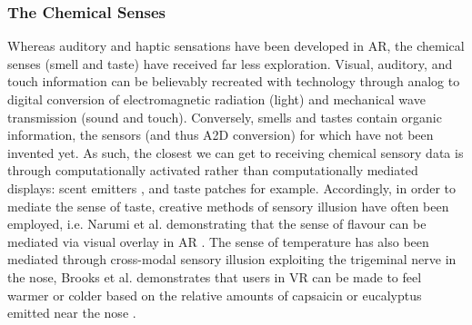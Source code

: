 \subsubsection{The Chemical Senses}\label{sec: literature-interface-sensory-chemical}
Whereas auditory and haptic sensations have been developed in AR, the chemical senses (smell and taste) have received far less exploration. Visual, auditory, and touch information can be believably recreated with technology through analog to digital conversion of electromagnetic radiation (light) and mechanical wave transmission (sound and touch). Conversely, smells and tastes contain organic information, the sensors (and thus A2D conversion) for which have not been invented yet. As such, the closest we can get to receiving chemical sensory data is through computationally activated rather than computationally mediated displays: scent emitters \citep{maggioni2019}, and taste patches for example. Accordingly, in order to mediate the sense of taste, creative methods of sensory illusion have often been employed, i.e. Narumi et al. demonstrating that the sense of flavour can be mediated via visual overlay in AR \citep{narumi2011}. The sense of temperature has also been mediated through cross-modal sensory illusion exploiting the trigeminal nerve in the nose, Brooks et al. demonstrates that users in VR can be made to feel warmer or colder based on the relative amounts of capsaicin or eucalyptus emitted near the nose \citeyearpar{brooks2020}.


